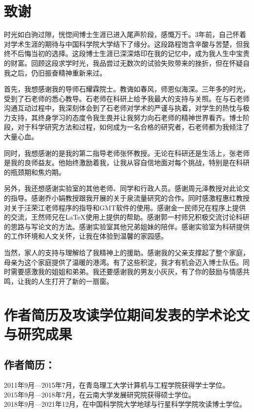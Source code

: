 \chapter[致谢]{致\quad 谢}

时光如白驹过隙，恍惚间博士生涯已进入尾声阶段，感慨万千。3年前，自己怀着对学术生涯的期待与中国科学院大学结下了缘分。这段路程饱含辛酸与苦楚，但我终不后悔当初的选择。这段博士生涯已深深烙印在我的记忆中，成为我人生中宝贵的财富。回顾这段求学时光，我品尝过无数次的试验失败带来的挫折，但在怀疑自我之后，仍旧振奋精神重新来过。

首先，我想感谢我的导师石耀霖院士。教诲如春风，师恩似海深。三年多的时光，受到了石老师的悉心教导。石老师在科研上给予我最大的支持与关照。在与石老师沟通互动过程中，我深刻体会到了石老师对学术的严谨与执着，对学生的热忱与极力支持，其终身学习的态度令我生畏并让我努力向石老师的精神世界看齐。博士阶段，对于科学研究方法和过程，如何成为一名合格的研究者，石老师都为我倾注了大量心血。

同时，我想感谢的是我的第二指导老师张怀教授。无论在科研还是生活上，张老师是我的良师益友。他始终激励着我，让我从容自信地面对每个挑战，特别是在科研的瓶颈期和焦灼期。

另外，我还想感谢实验室的其他老师、同学和行政人员。感谢周元泽教授对此论文的指导。感谢乔小娟教授跟我开展的关于泉流量研究的合作。同时感激程惠红教授对关于汪荣江老师程序的指导和GMT软件的使用。感谢金一民师兄在程序上提供的交流，王然师兄在\LaTeX{}使用上提供的帮助。感谢郭一村师兄积极交流讨论科研的思路与写论文的方法。感谢实验室其他兄弟姐妹的陪伴。感谢实验室为科研提供的工作环境和人文关怀，让我在体验到温馨的家园感。

当然，家人的支持与理解给了我精神上的援助。感谢我的父亲支撑起了整个家庭，母亲为这个家庭提供了温暖的港湾。有了这些积淀，我才有机会迈入博士队伍。同时需要感激我的姐姐和弟弟。我还要感谢我的男友小灰灰，有了你的鼓励与情感共鸣，让我的人生打开了新的一扇窗。


\chapter{作者简历及攻读学位期间发表的学术论文与研究成果}

\section*{作者简历：}
\noindent 2011年9月---2015年7月，在青岛理工大学计算机与工程学院获得学士学位。\\
\noindent 2015年9月---2018年7月，在云南大学发展研究院获得硕士学位。\\
\noindent 2018年9月---2021年12月，在中国科学院大学地球与行星科学学院攻读博士学位。

